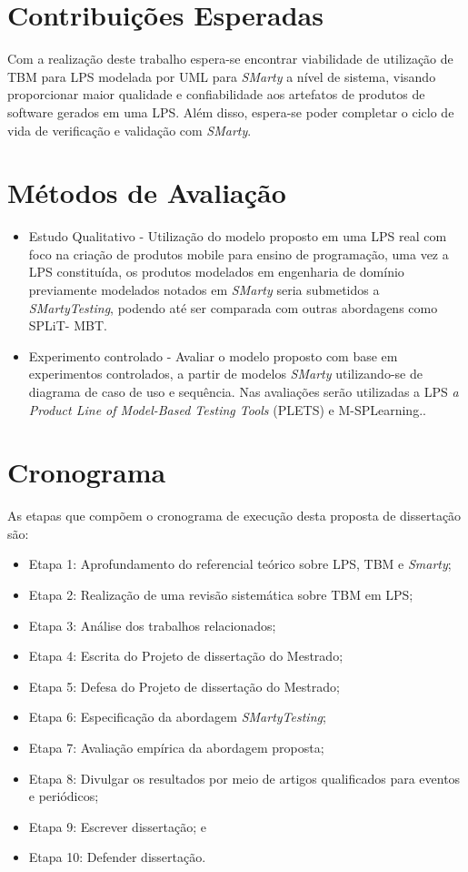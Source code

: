 \section{Contribuições Esperadas}
\label{sec:repres_e_fo}

Com a realização deste trabalho espera-se encontrar viabilidade de utilização de TBM para LPS modelada por UML para \textit{SMarty} a nível de sistema, visando proporcionar maior qualidade e confiabilidade aos artefatos de  produtos de software gerados em uma LPS. Além disso, espera-se poder completar o ciclo de vida de verificação e validação com \textit{SMarty}.

\section{Métodos de Avaliação}
\label{sec:repres_e_f}
\begin{itemize}
	\item Estudo Qualitativo - Utilização do modelo proposto em uma LPS real com foco na criação de produtos mobile para ensino de programação, uma vez a LPS constituída, os produtos modelados em engenharia de domínio previamente modelados notados em \textit{SMarty} seria submetidos a \textit{SMartyTesting}, podendo até ser comparada com outras abordagens como SPLiT- MBT.
	\item Experimento controlado - Avaliar o modelo proposto com base em experimentos controlados, a partir de modelos \textit{SMarty} utilizando-se de diagrama de caso de uso e sequência. Nas avaliações serão utilizadas a LPS \textit{a Product Line of Model-Based Testing Tools} (PLETS) e M-SPLearning..	
\end{itemize}

\section{Cronograma}
\label{sec:repres_e_fobj}
As etapas que compõem o cronograma de execução desta proposta de dissertação são:

\begin{itemize}
	\item Etapa 1: Aprofundamento do referencial teórico sobre LPS, TBM e \textit{Smarty};
	\item Etapa 2: Realização de uma revisão sistemática sobre TBM em LPS;
	\item Etapa 3: Análise dos trabalhos relacionados;
	\item Etapa 4: Escrita do Projeto de dissertação do Mestrado;
	\item Etapa 5: Defesa do Projeto de dissertação do Mestrado;
	\item Etapa 6: Especificação da abordagem \textit{SMartyTesting};
	\item Etapa 7: Avaliação empírica da abordagem proposta;
	\item Etapa 8: Divulgar os resultados por meio de artigos qualificados para eventos e periódicos;
	\item Etapa 9: Escrever dissertação; e
	\item Etapa 10: Defender dissertação.
\end{itemize}


